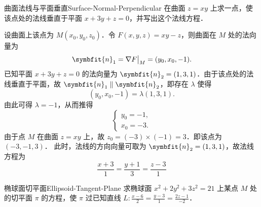 \begin{problem}{曲面法线与平面垂直}{Surface-Normal-Perpendicular}
    在曲面 $z = xy$ 上求一点，使该点处的法线垂直于平面 $x + 3y + z = 0$，并写出这个法线方程．
\end{problem}

\begin{solution}
    设曲面上该点为 $M(x_0, y_0, z_0)$．令 $F(x, y, z) = xy - z$，则曲面在 $M$ 处的法向量为
    \begin{equation}
        \symbfit{n}_1 = \nabla F \big|_M = (y_0, x_0, -1).
    \end{equation}
    已知平面 $x + 3y + z = 0$ 的法向量为 $\symbfit{n}_2 = (1, 3, 1)$．由于该点处的法线垂直于平面，故 $\symbfit{n}_1 \parallel \symbfit{n}_2$，即存在 $\lambda$ 使得
    \begin{equation}
        (y_0, x_0, -1) = \lambda (1, 3, 1).
    \end{equation}
    由此可得 $\lambda = -1$，从而推得
    \begin{equation}
        \begin{cases}
            y_0 = -1, \\
            x_0 = -3.
        \end{cases}
    \end{equation}
    由于点 $M$ 在曲面 $z = xy$ 上，故 $z_0 = (-3) \times (-1) = 3$．即该点为 $(-3, -1, 3)$．
    此时，法线的方向向量可取为 $\symbfit{n}_2 = (1, 3, 1)$，故法线方程为
    \begin{equation}
        \boxed{\frac{x + 3}{1} = \frac{y + 1}{3} = \frac{z - 3}{1}}
    \end{equation}
\end{solution}


\begin{problem}{椭球面切平面}{Ellipsoid-Tangent-Plane}
    求椭球面 $x^2 + 2y^2 + 3z^2 = 21$ 上某点 $M$ 处的切平面 $\pi$ 的方程，使 $\pi$ 过已知直线 $L: \frac{x - 6}{2} = \frac{y - 3}{1} = \frac{2z - 1}{-2}$．
\end{problem}


